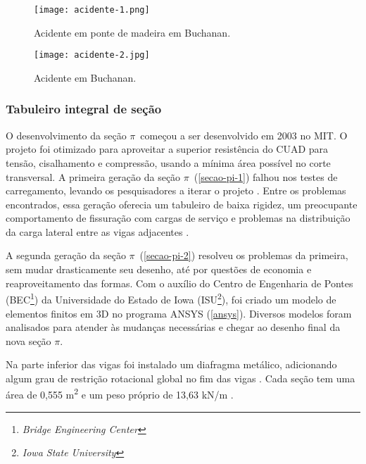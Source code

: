 \begin{figure}[htb]
	\caption{\label{acidente-1}Acidente em ponte de madeira em Buchanan.}
	\begin{center}
		\texttt{[image: acidente-1.png]}
	\end{center}
\end{figure}

\begin{figure}[htb]
	\caption{\label{acidente-2}Acidente em Buchanan.}
	\begin{center}
		\texttt{[image: acidente-2.jpg]}
	\end{center}
\end{figure}

\subsubsection{Tabuleiro integral de seção \textpi}

O desenvolvimento da seção $ \pi $~começou a ser desenvolvido em 2003 no MIT. O projeto foi otimizado para aproveitar a superior resistência do CUAD para tensão, cisalhamento e compressão, usando a mínima área possível no corte transversal. A primeira geração da seção $ \pi $~(\autoref{secao-pi-1}) falhou nos testes de carregamento, levando os pesquisadores a iterar o projeto \cite[p.~4]{Rouse}. Entre os problemas encontrados, essa geração oferecia um tabuleiro de baixa rigidez, um preocupante comportamento de fissuração com cargas de serviço e problemas na distribuição da carga lateral entre as vigas adjacentes .

A segunda geração da seção $ \pi $~(\autoref{secao-pi-2}) resolveu os problemas da primeira, sem mudar drasticamente seu desenho, até por questões de economia e reaproveitamento das formas. Com o auxílio do Centro de Engenharia de Pontes (BEC\footnote{\textit{Bridge Engineering Center}}) da Universidade do Estado de Iowa (ISU\footnote{\textit{Iowa State University}}), foi criado um modelo de elementos finitos em 3D no programa ANSYS (\autoref{ansys}). Diversos modelos foram analisados para atender às mudanças necessárias e chegar ao desenho final da nova seção $ \pi $.

Na parte inferior das vigas foi instalado um diafragma metálico, adicionando algum grau de restrição rotacional global no fim das vigas \cite[p.~7]{Rouse}. Cada seção tem uma área de 0,555 m\textsuperscript{2} e um peso próprio de 13,63 kN/m \cite[p.~8]{Rouse}.


